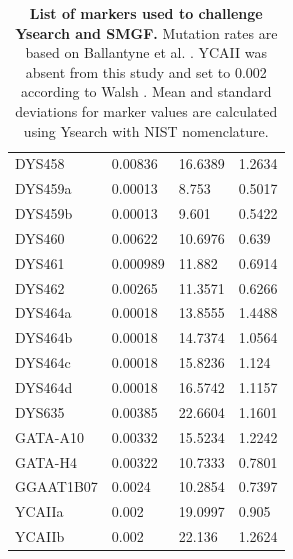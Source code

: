 \begin{table}[h!]
\begin{adjustbox}{height=0.4\textheight}
\begin{tabular}{l l l l}
DYS458    & 0.00836  & 16.6389 & 1.2634 \\
DYS459a   & 0.00013  & 8.753   & 0.5017 \\
DYS459b   & 0.00013  & 9.601   & 0.5422 \\
DYS460    & 0.00622  & 10.6976 & 0.639  \\
DYS461    & 0.000989 & 11.882  & 0.6914 \\
DYS462    & 0.00265  & 11.3571 & 0.6266 \\
DYS464a   & 0.00018  & 13.8555 & 1.4488 \\
DYS464b   & 0.00018  & 14.7374 & 1.0564 \\
DYS464c   & 0.00018  & 15.8236 & 1.124  \\
DYS464d   & 0.00018  & 16.5742 & 1.1157 \\
DYS635    & 0.00385  & 22.6604 & 1.1601 \\
GATA-A10  & 0.00332  & 15.5234 & 1.2242 \\
GATA-H4   & 0.00322  & 10.7333 & 0.7801 \\
GGAAT1B07 & 0.0024   & 10.2854 & 0.7397 \\
YCAIIa    & 0.002    & 19.0997 & 0.905  \\
YCAIIb    & 0.002    & 22.136  & 1.2624 \\
\hline
\end{tabular}
\end{adjustbox}
\caption{\textbf{List of markers used to challenge Ysearch and SMGF.} Mutation rates are based on Ballantyne et al. \cite{BallantyneGoedbloedFangEtAl2010}. YCAII was absent from this study and set to 0.002 according to Walsh \cite{Walsh2001}. Mean and standard deviations for marker values are calculated using Ysearch with NIST nomenclature.}
\end{table}

\pagebreak
